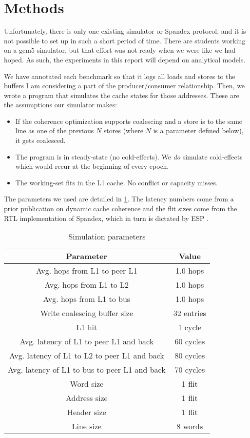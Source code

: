\section{Methods}
\label{sec:methods}

Unfortunately, there is only one existing simulator or Spandex protocol, and it is not possible to set up in such a short period of time. There are students working on a gem5 simulator, but that effort was not ready when we were like we had hoped. As such, the experiments in this report will depend on analytical models.

We have annotated each benchmark so that it logs all loads and stores to the buffers I am considering a part of the producer/consumer relationship. Then, we wrote a program that simulates the cache states for those addresses. These are the assumptions our simulator makes:

\begin{itemize}
    \item If the coherence optimization supports coalescing and a store is to the same line as one of the previous \(N\) stores (where \(N\) is a parameter defined below), it gets coalesced.
    \item The program is in steady-state (no cold-effects). We \textit{do} simulate cold-effects which would recur at the beginning of every epoch. 
    \item The working-set fits in the L1 cache. No conflict or capacity misses.
\end{itemize}

The parameters we used are detailed in \cref{table:params}. The latency numbers come from a prior publication on dynamic cache coherence \cite{dynamic_cache_coherence} and the flit sizes come from the RTL implementation of Spandex, which in turn is dictated by ESP \cite{ESP}.

\begin{table}[h]
  \caption{Simulation parameters}
  \label{table:params}
  \begin{tabular}{cc}
  \toprule
  \textbf{Parameter} & \textbf{Value} \\
  \midrule
  Avg. hops from L1 to peer L1 & 1.0 hops \\
  Avg. hops from L1 to L2 & 1.0 hops \\
  Avg. hops from L1 to bus & 1.0 hops \\
  Write coalescing buffer size & 32 entries \\
  L1 hit & 1 cycle \\
  Avg. latency of L1 to peer L1 and back & 60 cycles \\
  Avg. latency of L1 to L2 to peer L1 and back & 80 cycles \\
  Avg. latency of  L1 to bus to peer L1 and back & 70 cycles \\
  Word size & 1 flit \\
  Address size & 1 flit \\
  Header size & 1 flit \\
  Line size & 8 words \\
  \bottomrule
\end{tabular}
\end{table}

